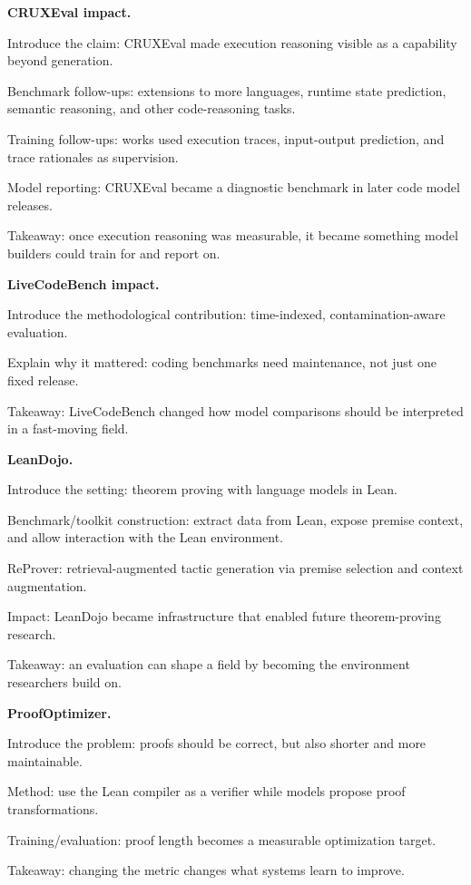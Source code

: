 \documentclass[10pt,twocolumn]{article}
\let\olditemize\itemize
\let\oldenditemize\enditemize
\renewenvironment{itemize}{\olditemize
  \setlength{\itemsep}{1pt}
  \setlength{\parskip}{0pt}
  \setlength{\parsep}{0pt}
  \setlength{\topsep}{2pt}
}{\oldenditemize}
\begin{document}
\textbf{CRUXEval impact.}
\begin{itemize}
  \item Introduce the claim: CRUXEval made execution reasoning visible as a capability beyond generation.
  \item Benchmark follow-ups: extensions to more languages, runtime state prediction, semantic reasoning, and other code-reasoning tasks.
  \item Training follow-ups: works used execution traces, input-output prediction, and trace rationales as supervision.
  \item Model reporting: CRUXEval became a diagnostic benchmark in later code model releases.
  \item Takeaway: once execution reasoning was measurable, it became something model builders could train for and report on.
\end{itemize}

\textbf{LiveCodeBench impact.}
\begin{itemize}
  \item Introduce the methodological contribution: time-indexed, contamination-aware evaluation.
  \item Explain why it mattered: coding benchmarks need maintenance, not just one fixed release.
  \item Takeaway: LiveCodeBench changed how model comparisons should be interpreted in a fast-moving field.
\end{itemize}

\textbf{LeanDojo.}
\begin{itemize}
  \item Introduce the setting: theorem proving with language models in Lean.
  \item Benchmark/toolkit construction: extract data from Lean, expose premise context, and allow interaction with the Lean environment.
  \item ReProver: retrieval-augmented tactic generation via premise selection and context augmentation.
  \item Impact: LeanDojo became infrastructure that enabled future theorem-proving research.
  \item Takeaway: an evaluation can shape a field by becoming the environment researchers build on.
\end{itemize}

\textbf{ProofOptimizer.}
\begin{itemize}
  \item Introduce the problem: proofs should be correct, but also shorter and more maintainable.
  \item Method: use the Lean compiler as a verifier while models propose proof transformations.
  \item Training/evaluation: proof length becomes a measurable optimization target.
  \item Takeaway: changing the metric changes what systems learn to improve.
\end{itemize}
\end{document}
